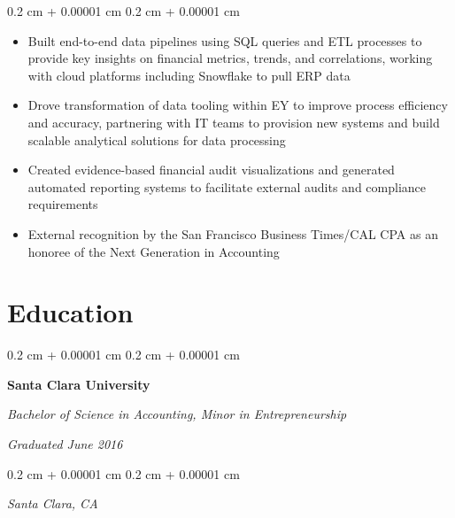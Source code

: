 \documentclass[10pt, letterpaper]{article}
\newenvironment{highlights}{
    \begin{itemize}[
        topsep=0.10 cm,
        parsep=0.10 cm,
        partopsep=0pt,
        itemsep=0pt,
        leftmargin=0.4 cm + 10pt
    ]
}{
    \end{itemize}
} %
\newenvironment{onecolentry}{
    \begin{adjustwidth}{
        0.2 cm + 0.00001 cm
    }{
        0.2 cm + 0.00001 cm
    }
}{
    \end{adjustwidth}
} %
\newenvironment{twocolentry}[2][]{
    \onecolentry
    \def\secondColumn{#2}
    \setcolumnwidth{\fill, 5.5 cm}
    \begin{paracol}{2}
}{
    \switchcolumn \raggedleft \secondColumn
    \end{paracol}
    \endonecolentry
} %
\begin{document}
\begin{onecolentry}
\begin{highlights}
                \item Built end-to-end data pipelines using SQL queries and ETL processes to provide key insights on financial metrics, trends, and correlations, working with cloud platforms including Snowflake to pull ERP data
                \item Drove transformation of data tooling within EY to improve process efficiency and accuracy, partnering with IT teams to provision new systems and build scalable analytical solutions for data processing
                \item Created evidence-based financial audit visualizations and generated automated reporting systems to facilitate external audits and compliance requirements
                \item External recognition by the San Francisco Business Times/CAL CPA as an honoree of the Next Generation in Accounting
            \end{highlights}
        \end{onecolentry}




    
    \section{Education}

        \begin{twocolentry}{
            \textit{Graduated June 2016}}
            \textbf{Santa Clara University}

            \textit{Bachelor of Science in Accounting, Minor in Entrepreneurship}
        \end{twocolentry}

        \vspace{0.10 cm}
        \begin{onecolentry}
            \textit{Santa Clara, CA}
        \end{onecolentry}
\end{document}
